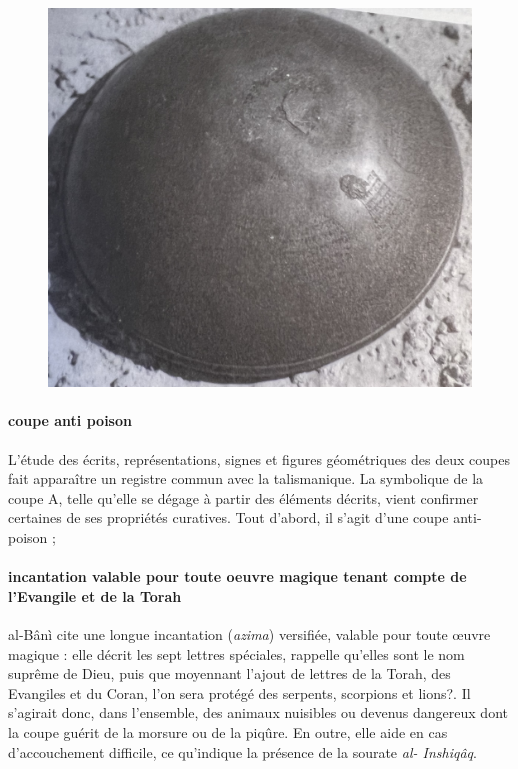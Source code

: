 \begin{figure}
    \centering

  \includegraphics[width=\textwidth]{HommeetIslam/Images/IMG_2458recadre.png}

 
    \label{fig:my_label}
\end{figure}
  \paragraph{coupe anti poison}
L'étude des écrits, représentations, signes et figures géométriques des deux coupes fait apparaître un registre commun avec la talismanique. La symbolique de la coupe A, telle qu'elle se dégage à partir des éléments décrits, vient confirmer certaines de ses propriétés curatives. Tout d'abord, il s'agit d'une coupe anti-poison ; 

\paragraph{incantation valable pour toute oeuvre magique tenant compte de l'Evangile et de la Torah}al-Bânì cite une longue incantation (\textit{azima}) versifiée, valable pour toute œuvre magique : elle décrit les sept lettres spéciales, rappelle qu'elles sont le nom suprême de Dieu, puis que moyennant l'ajout de lettres de la Torah, des Evangiles et du Coran, l'on sera protégé des serpents, scorpions et lions?. Il s'agirait donc, dans l'ensemble, des animaux nuisibles ou devenus dangereux dont la coupe guérit de la morsure ou de la piqûre. En outre, elle aide en cas d'accouchement difficile, ce qu'indique la présence de la sourate \textit{al-
Inshiqâq}. 

